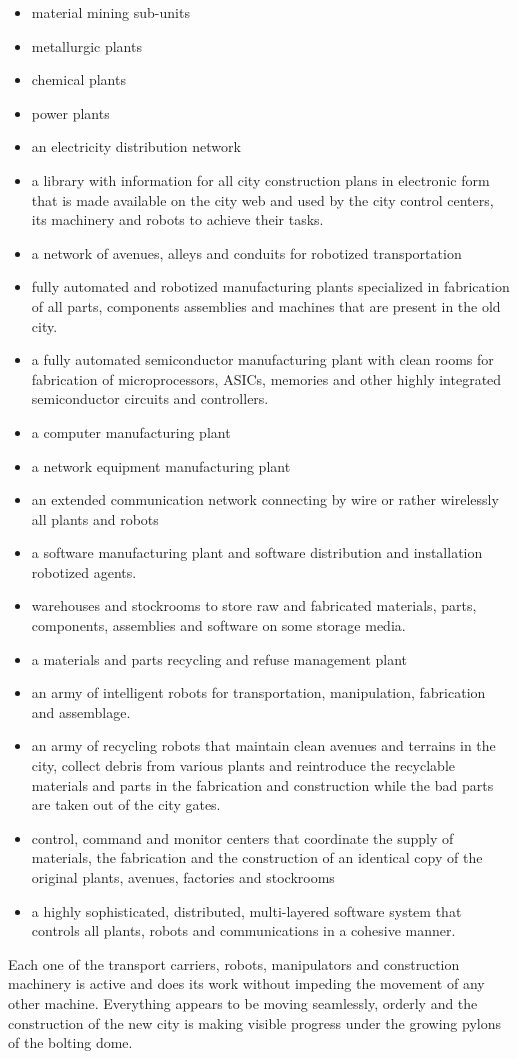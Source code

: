 \begin{itemize}
\item material mining sub-units 
\item metallurgic plants
\item chemical plants
\item power plants
\item an electricity distribution network
\item a library with information for all city construction plans in
electronic form that is made available on the city web and used by the
city control centers, its machinery and robots to achieve their tasks. 
\item a network of avenues, alleys and conduits for robotized
transportation
\item fully automated and robotized manufacturing plants specialized in
fabrication of all parts, components assemblies and machines that are
present in the old city.
\item a fully automated semiconductor manufacturing plant with clean
rooms for fabrication of microprocessors, ASICs, memories and other
highly integrated semiconductor circuits and controllers.
\item a computer manufacturing plant
\item a network equipment manufacturing plant
\item an extended communication network connecting by wire or rather
wirelessly all plants and robots
\item a software manufacturing plant and software distribution and
installation robotized agents.
\item warehouses and stockrooms to store raw and fabricated materials,
parts, components, assemblies and software on some storage media.
\item a materials and parts recycling and refuse management plant
\item an army of intelligent robots for transportation, manipulation,
fabrication and assemblage.
\item an army of recycling robots that maintain clean avenues and
terrains in the city, collect debris from various plants and
reintroduce the recyclable materials and parts in the fabrication and
construction while the bad parts are taken out of the city gates.
\item control, command and monitor centers that coordinate the supply of
materials, the fabrication and the construction of an identical copy of
the original plants, avenues, factories and stockrooms
\item a highly sophisticated, distributed, multi-layered software system
that controls all plants, robots and communications in a cohesive
manner.
\end{itemize}
Each one of the transport carriers, robots, manipulators and
construction machinery is active and does its work without impeding the
movement of any other machine. Everything appears to be moving
seamlessly, orderly and the construction of the new city is making
visible progress under the growing pylons of the bolting dome.


